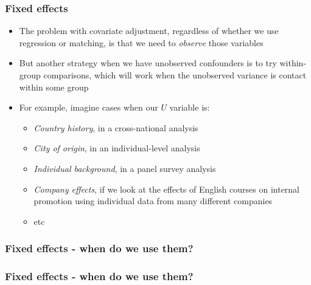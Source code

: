 \documentclass[aspectratio=43]{beamer}
\begin{document}
\begin{frame}
\frametitle{Fixed effects}
\centering

\begin{itemize}
  \item The problem with covariate adjustment, regardless of whether we use regression or matching, is that we need to \textit{observe} those variables
  \item But another strategy when we have unobserved confounders is to try within-group comparisons, which will work when the unobserved variance is contact within some group
  \item For example, imagine cases when our $U$ variable is:
  \begin{itemize}
    \item \textit{Country history}, in a cross-national analysis
    \item \textit{City of origin}, in an individual-level analysis
    \item \textit{Individual background}, in a panel survey analysis
    \item \textit{Company effects}, if we look at the effects of English courses on internal promotion using individual data from many different companies
    \item etc
  \end{itemize}
\end{itemize}

\end{frame}

\begin{frame}
\frametitle{Fixed effects - when do we use them?}
\centering


\end{frame}

\begin{frame}
\frametitle{Fixed effects - when do we use them?}
\centering


\end{frame}
\end{document}
